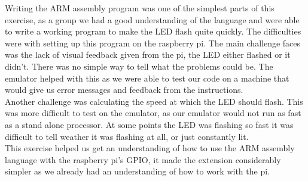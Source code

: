 Writing the ARM assembly program was one of the simplest parts of this exercise, as a group we had a good understanding of the language and were able to write a working program to make the LED flash quite quickly. The difficulties were with setting up this program on the raspberry pi. The main challenge faces was the lack of visual feedback given from the pi, the LED either flashed or it didn't. There was no simple way to tell what the problems could be. The emulator helped with this as we were able to test our code on a machine that would give us error messages and feedback from the instructions.
~\\

Another challenge was calculating the speed at which the LED should flash. This was more difficult to test on the emulator, as our emulator would not run as fast as a stand alone processor. At some points the LED was flashing so fast it was difficult to tell weather it was flashing at all, or just constantly lit. 
~\\

This exercise helped us get an understanding of how to use the ARM assembly language with the raspberry pi's GPIO, it made the extension considerably simpler as we already had an understanding of how to work with the pi.